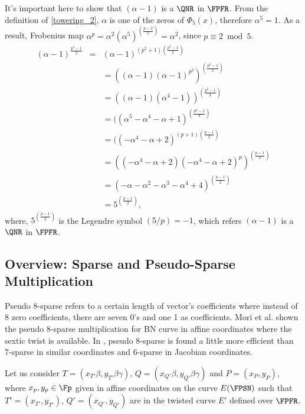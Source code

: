 It's important here to show that $(\alpha-1)$ is a $\QNR$ in $\FPFR$. 
From the definition of \eqref{towering_2}, $\alpha$ is one of the zeros of $\Phi_{5}(x)$, therefore $\alpha^5=1$.
As a result, Frobenius map $\alpha^p = \alpha^2(\alpha^5)^{(\frac{p-2}{5})}=\alpha^2$, since $p \equiv 2 \bmod 5$.
\begin{eqnarray}
(\alpha-1)^{\frac{p^4-1}{2}} & = & (\alpha-1)^{(p^2+1)(\frac{p^2-1}{2})} \nonumber \\
& & = ((\alpha-1)(\alpha-1)^{p^2})^{(\frac{p^2-1}{2})} \nonumber \\
& & = ((\alpha-1)(\alpha^4-1))^{(\frac{p^2-1}{2})} \nonumber \\
& & = ((\alpha^5-\alpha^4-\alpha+1)^{(\frac{p^2-1}{2})} \nonumber \\
& & = ((-\alpha^4-\alpha+2)^{(p+1)(\frac{p-1}{2})}  \nonumber \\
& & = ((-\alpha^4-\alpha+2)(-\alpha^4-\alpha+2)^p)^{(\frac{p-1}{2})}  \nonumber \\
& & = (-\alpha-\alpha^2-\alpha^3-\alpha^4+4)^{(\frac{p-1}{2})}  \nonumber \\
& & =5^{(\frac{p-1}{2})},  \nonumber
\end{eqnarray}
where, $5^{(\frac{p-1}{2})}$ is the Legendre symbol $(5/p) = -1$, which refers $(\alpha-1)$ is a $\QNR$ in $\FPFR$.

\subsection{Overview: Sparse and Pseudo-Sparse Multiplication}
Pseudo 8-sparse refers to a certain length of vector's coefficients where instead of 8 zero coefficients, there are seven  0's and one 1 as coefficients.
Mori et al. \cite{mori}  shown the pseudo 8-sparse multiplication for BN curve in affine coordinates where the sextic twist is available. In \cite{mori}, pseudo 8-sparse is found a little more efficient than 7-sparse in similar coordinates and 6-sparse in Jacobian coordinates. 

Let us consider  $T=(x_{T'} \beta, y_{T'} \beta \gamma)$, $Q=(x_{Q'} \beta, y_{Q'}\beta \gamma)$  and  $P=(x_P,y_P) $, where $x_p, y_p \in \Fp$ given in affine coordinates on the curve $E(\FPSN)$ such that $T'=(x_{T'},y_{T'})$, $Q'=(x_{Q'},y_{Q'})$ are in the twisted curve $E'$ defined over $\FPFR$.

